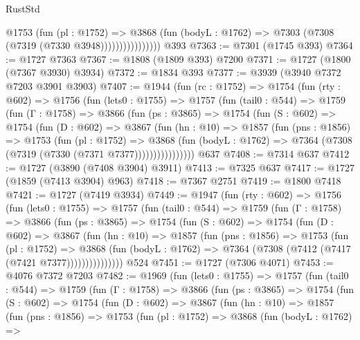 \begin{lexlean}{RustStd}
\begin{coremodule}
                        @1753
                          (fun (pl : @1752) =>
                          @3868
                            (fun (bodyL : @1762) => @7303 (@7308 (@7319 (@7330 @3948))))))))))))))))
    @393
@7363 := @7301 (@1745 @393)
@7364 := @1727 @7363
@7367 := @1808 (@1809 @393) @7200
@7371 := @1727 (@1800 (@7367 @3930) @3934)
@7372 := @1834 @393
@7377 := @3939 (@3940 @7372 @7203 @3901 @3903)
@7407 := @1944
    (fun (rc : @1752) =>
    @1754
      (fun (rty : @602) =>
      @1756
        (fun (lets0 : @1755) =>
        @1757
          (fun (tail0 : @544) =>
          @1759
            (fun (Γ : @1758) =>
            @3866
              (fun (ps : @3865) =>
              @1754
                (fun (S : @602) =>
                @1754
                  (fun (D : @602) =>
                  @3867
                    (fun (hn : @10) =>
                    @1857
                      (fun (pns : @1856) =>
                      @1753
                        (fun (pl : @1752) =>
                        @3868
                          (fun (bodyL : @1762) =>
                          @7364 (@7308 (@7319 (@7330 (@7371 @7377))))))))))))))))
    @637
@7408 := @7314 @637
@7412 := @1727 (@3890 (@7408 @3904) @3911)
@7413 := @7325 @637
@7417 := @1727 (@1859 (@7413 @3904) @963)
@7418 := @7367 @2751
@7419 := @1800 @7418
@7421 := @1727 (@7419 @3934)
@7449 := @1947
    (fun (rty : @602) =>
    @1756
      (fun (lets0 : @1755) =>
      @1757
        (fun (tail0 : @544) =>
        @1759
          (fun (Γ : @1758) =>
          @3866
            (fun (ps : @3865) =>
            @1754
              (fun (S : @602) =>
              @1754
                (fun (D : @602) =>
                @3867
                  (fun (hn : @10) =>
                  @1857
                    (fun (pns : @1856) =>
                    @1753
                      (fun (pl : @1752) =>
                      @3868
                        (fun (bodyL : @1762) =>
                        @7364 (@7308 (@7412 (@7417 (@7421 @7377)))))))))))))))
    @524
@7451 := @1727 (@7306 @4071)
@7453 := @4076 @7372 @7203
@7482 := @1969
    (fun (lets0 : @1755) =>
    @1757
      (fun (tail0 : @544) =>
      @1759
        (fun (Γ : @1758) =>
        @3866
          (fun (ps : @3865) =>
          @1754
            (fun (S : @602) =>
            @1754
              (fun (D : @602) =>
              @3867
                (fun (hn : @10) =>
                @1857
                  (fun (pns : @1856) =>
                  @1753
                    (fun (pl : @1752) =>
                    @3868
                      (fun (bodyL : @1762) =>

\end{coremodule}
\end{lexlean}
